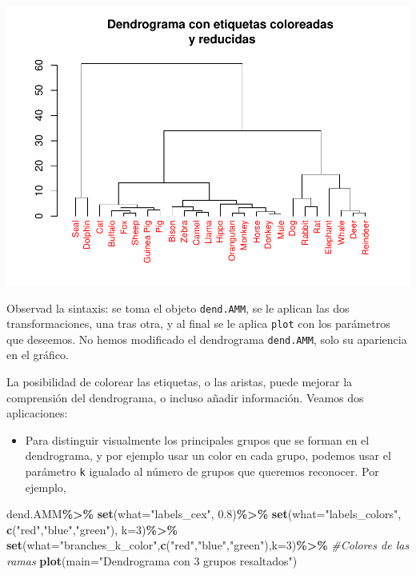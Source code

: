 \documentclass[
]{book}
\newenvironment{Shaded}{\begin{snugshade}}{\end{snugshade}}
\newcommand{\CommentTok}[1]{\textcolor[rgb]{0.56,0.35,0.01}{\textit{#1}}}
\newcommand{\DataTypeTok}[1]{\textcolor[rgb]{0.13,0.29,0.53}{#1}}
\newcommand{\DecValTok}[1]{\textcolor[rgb]{0.00,0.00,0.81}{#1}}
\newcommand{\FloatTok}[1]{\textcolor[rgb]{0.00,0.00,0.81}{#1}}
\newcommand{\KeywordTok}[1]{\textcolor[rgb]{0.13,0.29,0.53}{\textbf{#1}}}
\newcommand{\NormalTok}[1]{#1}
\newcommand{\OperatorTok}[1]{\textcolor[rgb]{0.81,0.36,0.00}{\textbf{#1}}}
\newcommand{\StringTok}[1]{\textcolor[rgb]{0.31,0.60,0.02}{#1}}
\providecommand{\tightlist}{%
  \setlength{\itemsep}{0pt}\setlength{\parskip}{0pt}}
\theoremstyle{definition}
\theoremstyle{definition}
\theoremstyle{definition}
\theoremstyle{remark}
\begin{document}
\begin{center}\includegraphics[width=0.9\linewidth]{14cap13_EDextra_files/figure-latex/unnamed-chunk-26-1} \end{center}

Observad la sintaxis: se toma el objeto \texttt{dend.AMM}, se le aplican las dos transformaciones, una tras otra, y al final se le aplica \texttt{plot} con los parámetros que deseemos.
No hemos modificado el dendrograma \texttt{dend.AMM}, solo su apariencia en el gráfico.

La posibilidad de colorear las etiquetas, o las aristas, puede mejorar la comprensión del dendrograma, o incluso añadir información. Veamos dos aplicaciones:

\begin{itemize}
\tightlist
\item
  Para distinguir visualmente los principales grupos que se forman en el dendrograma, y por ejemplo usar un color en cada grupo, podemos usar el parámetro \texttt{k} igualado al número de grupos que queremos reconocer.
  Por ejemplo,
\end{itemize}

\begin{Shaded}
\begin{Highlighting}[]
\NormalTok{dend.AMM}\OperatorTok{\%\textgreater{}\%}
\StringTok{   }\KeywordTok{set}\NormalTok{(}\DataTypeTok{what=}\StringTok{"labels\_cex"}\NormalTok{, }\FloatTok{0.8}\NormalTok{)}\OperatorTok{\%\textgreater{}\%}
\StringTok{   }\KeywordTok{set}\NormalTok{(}\DataTypeTok{what=}\StringTok{"labels\_colors"}\NormalTok{, }\KeywordTok{c}\NormalTok{(}\StringTok{"red"}\NormalTok{,}\StringTok{"blue"}\NormalTok{,}\StringTok{"green"}\NormalTok{), }\DataTypeTok{k=}\DecValTok{3}\NormalTok{)}\OperatorTok{\%\textgreater{}\%}
\StringTok{   }\KeywordTok{set}\NormalTok{(}\DataTypeTok{what=}\StringTok{"branches\_k\_color"}\NormalTok{,}\KeywordTok{c}\NormalTok{(}\StringTok{"red"}\NormalTok{,}\StringTok{"blue"}\NormalTok{,}\StringTok{"green"}\NormalTok{),}\DataTypeTok{k=}\DecValTok{3}\NormalTok{)}\OperatorTok{\%\textgreater{}\%}\StringTok{ }\CommentTok{\#Colores de las ramas}
\StringTok{   }\KeywordTok{plot}\NormalTok{(}\DataTypeTok{main=}\StringTok{"Dendrograma con 3 grupos resaltados"}\NormalTok{)}
\end{Highlighting}
\end{Shaded}
\end{document}
